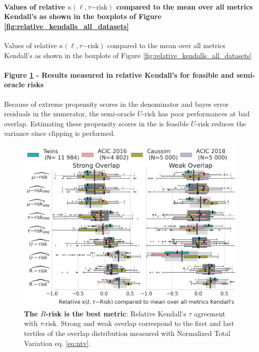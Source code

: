 \documentclass{report}
\begin{document}
\begin{appendices}
  \paragraph{Values of relative $\kappa(\ell,\tau\mathrm{{-risk}})$ compared to
    the mean over all metrics Kendall's as shown in the boxplots of Figure \ref{fig:relative_kendalls_all_datasets}}

  \begin{table}
    \centering
    \resizebox{0.7\textwidth}{!}{
      
    }
    \caption{Values of relative $\kappa(\ell,\tau\mathrm{{-risk}})$ compared to
      the mean over all metrics Kendall's as shown in the boxplots of Figure
      \ref{fig:relative_kendalls_all_datasets}}\label{apd:table:relative_kendalls_all_datasets}
  \end{table}


  \paragraph{Figure \ref{apd:fig:relative_kendalls_all_datasets_all_metrics} -
    Results measured in relative Kendall's for feasible and semi-oracle risks}

  Because of extreme propensity scores in the denominator and bayes error residuals in the numerator, the semi-oracle
  $U$-risk has poor performances at bad overlap. Estimating these propensity scores in the is feasible $U$-risk reduces
  the variance since clipping is performed.

  \begin{figure}[!b]
    \centering
    \includegraphics[width=\linewidth]{img/chapter_5/_1_r_risk_domination_r_risk_domination__ref_metric_mean_risks_by_Dataset.png}
    \caption{\textbf{The $R$-risk is the best metric}: Relative Kendall's $\tau$
      agreement with $\tau\text{-risk}$. Strong and weak overlap correspond to
      the first and last tertiles of the overlap distribution measured with
      Normalized Total Variation eq. \ref{eq:ntv}.
    }\label{apd:fig:relative_kendalls_all_datasets_all_metrics}
  \end{figure}


\end{appendices}
\end{document}
